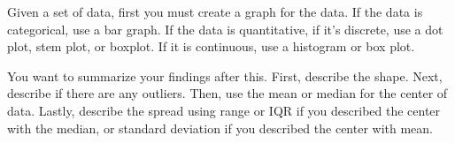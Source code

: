 \documentclass[../stats.tex]{subfiles}
\begin{document}
Given a set of data, first you must create a graph for the data. If the data is categorical, use a bar graph. If the data is quantitative, if it's discrete, use a dot plot, stem plot, or boxplot. If it is continuous, use a histogram or box plot. 

You want to summarize your findings after this. First, describe the shape. Next, describe if there are any outliers. Then, use the mean or median for the center of data. Lastly, describe the spread using range or IQR if you described the center with the median, or standard deviation if you described the center with mean. 
\end{document}
